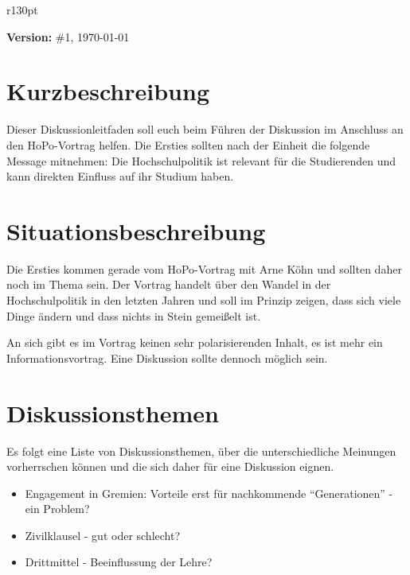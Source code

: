 \documentclass[a4paper,11pt]{scrartcl} %
\newenvironment{myitemize}{\begin{itemize}\itemsep -2pt}{\end{itemize}} %
\begin{document}
\thispagestyle{firststyle}

\begin{wrapfigure}{r}{130pt}
\vspace{-45pt}
  \fbox{
  \begin{minipage}{140pt}
   \tableofcontents
  \end{minipage}
  }
\end{wrapfigure}

\textbf{Version:} \#1, \today %

\section{Kurzbeschreibung} %
    Dieser Diskussionleitfaden soll euch beim Führen der Diskussion
    im Anschluss an den HoPo-Vortrag helfen. Die Ersties sollten nach 
    der Einheit die folgende Message mitnehmen:
    Die Hochschulpolitik ist relevant für die Studierenden und kann
    direkten Einfluss auf ihr Studium haben.
  
 
\section{Situationsbeschreibung} 
Die Ersties kommen gerade vom HoPo-Vortrag mit Arne Köhn und sollten daher noch im Thema sein.
Der Vortrag handelt über den Wandel in der Hochschulpolitik in den letzten Jahren und soll
im Prinzip zeigen, dass sich viele Dinge ändern und dass nichts in Stein gemeißelt ist.

An sich gibt es im Vortrag keinen sehr polarisierenden Inhalt, es ist mehr ein Informationsvortrag.
Eine Diskussion sollte dennoch möglich sein.

\section{Diskussionsthemen}

Es folgt eine Liste von Diskussionsthemen, über die unterschiedliche Meinungen vorherrschen können
und die sich daher für eine Diskussion eignen.

\begin{myitemize}
  \item Engagement in Gremien: Vorteile erst für nachkommende "`Generationen"' - ein Problem?
  \item Zivilklausel - gut oder schlecht?
  \item Drittmittel - Beeinflussung der Lehre?
\end{myitemize}
\end{document}
